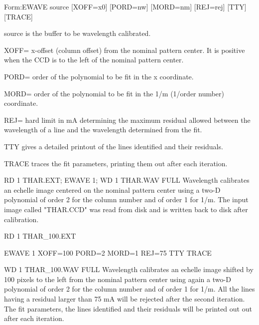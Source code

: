{\newpage\clearpage
{}%
\begin{command}
  \item[Form:EWAVE source {[XOFF=x0]} {[PORD=nw]} {[MORD=nm]} {[REJ=rej]} 
       {[TTY]} {[TRACE]} \hfill]{}
  \item[source]{is the buffer to be wavelength calibrated.}
  \item[XOFF=]{x-offset (column offset) from the nominal 
       pattern center. It is positive when the CCD
       is to the left of the nominal pattern center.}
  \item[PORD=]{order of the polynomial to be fit in the x coordinate.}
  \item[MORD=]{order of the polynomial to be fit in the 1/m
       (1/order number) coordinate.}
  \item[REJ=]{hard limit in mA determining the maximum residual
       allowed between the wavelength of a line and the
       wavelength determined from the fit.}
  \item[TTY]{gives a detailed printout of the lines identified and 
       their residuals.}
  \item[TRACE]{traces the fit parameters, printing them out after each 
       iteration.}
\end{command}%
\lthtmlfigureZ
\lthtmlcheckvsize\clearpage}

{\newpage\clearpage
{}%
\begin{example}
  \item[RD 1 THAR.EXT; EWAVE 1; WD 1 THAR.WAV FULL\hfill]{ Wavelength
       calibrates an echelle image centered on the nominal pattern center
       using a two-D polynomial of order 2 for the column number and of
       order 1 for 1/m.  The input image called "THAR.CCD" was read from
       disk and is written back to disk after calibration.}
\par\item[RD 1 THAR\_100.EXT\hfill]{}
\par\item[EWAVE 1 XOFF=100 PORD=2 MORD=1 REJ=75 TTY TRACE\hfill]{}
\par\item[WD 1 THAR\_100.WAV FULL\hfill]{ Wavelength calibrates an echelle
       image shifted by 100 pixels to the left from the nominal pattern
       center using again a two-D polynomial of order 2 for the column
       number and of order 1 for 1/m.  All the lines having a residual
       larger than 75 mA will be rejected after the second iteration.  The
       fit parameters, the lines identified and their residuals will be
       printed out out after each iteration.}
\end{example}%
\lthtmlfigureZ
\lthtmlcheckvsize\clearpage}

